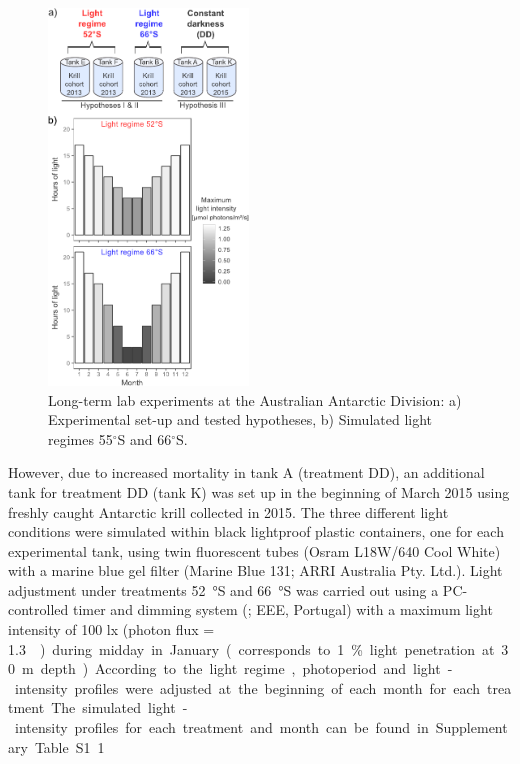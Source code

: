 \begin{figure}[ht!]
        \centering
        \includegraphics[height=10cm,keepaspectratio]{../Figures/Pub2_1.pdf}
        \caption{Long-term lab experiments at the Australian Antarctic Division: a) Experimental set-up and tested hypotheses, b) Simulated light regimes 55$^{\circ}$S and 66$^{\circ}$S.}
        \label{Pub2_1}
\end{figure}

However, due to increased mortality in tank A (treatment DD), an additional
tank for treatment DD (tank K) was set up in the beginning of March 2015 using
freshly caught Antarctic krill collected in 2015. The three different light
conditions were simulated within black lightproof plastic containers, one for
each experimental tank, using twin fluorescent tubes (Osram L18W/640 Cool
White) with a marine blue gel filter (Marine Blue 131; ARRI Australia Pty.
Ltd.). Light adjustment under treatments \SI{52}{\degree}S and
\SI{66}{\degree}S was carried out using a PC-controlled timer and dimming
system (; EEE, Portugal) with a maximum light
intensity of 100 lx (photon flux =
\SI{1.3}{\micro\mole\per\meter\square\per\second}) during midday in January
(corresponds to 1\% light penetration at \SI{30}{\meter} depth).  According to
the light regime, photoperiod and light-intensity profiles were adjusted at the
beginning of each month for each treatment. The simulated light-intensity
profiles for each treatment and month can be found in Supplementary Table S1.1 

